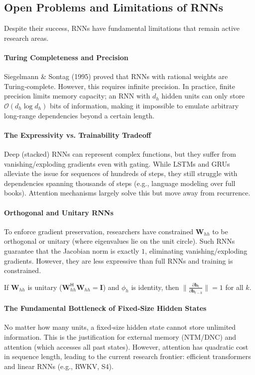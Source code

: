\documentclass{tufte-handout}
\begin{document}
\subsection{Open Problems and Limitations of RNNs}

Despite their success, RNNs have fundamental limitations that remain active research areas.

\paragraph{Turing Completeness and Precision}
Siegelmann \& Sontag (1995) proved that RNNs with rational weights are Turing‑complete. However, this requires infinite precision. In practice, finite precision limits memory capacity; an RNN with $d_h$ hidden units can only store $\mathcal{O}(d_h \log d_h)$ bits of information, making it impossible to emulate arbitrary long‑range dependencies beyond a certain length.

\paragraph{The Expressivity vs. Trainability Tradeoff}
Deep (stacked) RNNs can represent complex functions, but they suffer from vanishing/exploding gradients even with gating. While LSTMs and GRUs alleviate the issue for sequences of hundreds of steps, they still struggle with dependencies spanning thousands of steps (e.g., language modeling over full books). Attention mechanisms largely solve this but move away from recurrence.

\paragraph{Orthogonal and Unitary RNNs}
To enforce gradient preservation, researchers have constrained $\mathbf{W}_{hh}$ to be orthogonal or unitary (where eigenvalues lie on the unit circle). Such RNNs guarantee that the Jacobian norm is exactly $1$, eliminating vanishing/exploding gradients. However, they are less expressive than full RNNs and training is constrained.

\begin{thm}
    If $\mathbf{W}_{hh}$ is unitary ($\mathbf{W}_{hh}^{\mathsf{H}} \mathbf{W}_{hh} = \mathbf{I}$) and $\phi_h$ is identity, then $\|\frac{\partial \mathbf{h}_t}{\partial \mathbf{h}_{t-k}}\| = 1$ for all $k$.
\end{thm}

\paragraph{The Fundamental Bottleneck of Fixed‑Size Hidden States}
No matter how many units, a fixed‑size hidden state cannot store unlimited information. This is the justification for external memory (NTM/DNC) and attention (which accesses all past states). However, attention has quadratic cost in sequence length, leading to the current research frontier: efficient transformers and linear RNNs (e.g., RWKV, S4).
\end{document}
